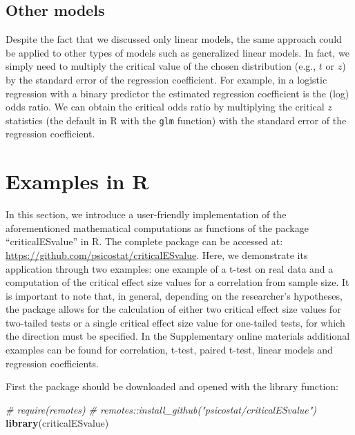 \documentclass[
  man]{apa7}
\newenvironment{Shaded}{\begin{snugshade}}{\end{snugshade}}
\newcommand{\CommentTok}[1]{\textcolor[rgb]{0.56,0.35,0.01}{\textit{#1}}}
\newcommand{\FunctionTok}[1]{\textcolor[rgb]{0.13,0.29,0.53}{\textbf{#1}}}
\newcommand{\NormalTok}[1]{#1}
\begin{document}
\hypertarget{other-models}{%
\subsection{Other models}\label{other-models}}

Despite the fact that we discussed only linear models, the same approach could be applied to other types of models such as generalized linear models. In fact, we simply need to multiply the critical value of the chosen distribution (e.g., \(t\) or \(z\)) by the standard error of the regression coefficient. For example, in a logistic regression with a binary predictor the estimated regression coefficient is the (log) odds ratio. We can obtain the critical odds ratio by multiplying the critical \(z\) statistics (the default in R with the \texttt{glm} function) with the standard error of the regression coefficient.

\hypertarget{examples-in-r}{%
\section{Examples in R}\label{examples-in-r}}

In this section, we introduce a user-friendly implementation of the aforementioned mathematical computations as functions of the package ``criticalESvalue'' in R. The complete package can be accessed at: \url{https://github.com/psicostat/criticalESvalue}. Here, we demonstrate its application through two examples: one example of a t-test on real data and a computation of the critical effect size values for a correlation from sample size. It is important to note that, in general, depending on the researcher's hypotheses, the package allows for the calculation of either two critical effect size values for two-tailed tests or a single critical effect size value for one-tailed tests, for which the direction must be specified. In the Supplementary online materials additional examples can be found for correlation, t-test, paired t-test, linear models and regression coefficients.

First the package should be downloaded and opened with the library function:

\footnotesize

\begin{Shaded}
\begin{Highlighting}[]
\CommentTok{\# require(remotes)}
\CommentTok{\# remotes::install\_github("psicostat/criticalESvalue")}
\FunctionTok{library}\NormalTok{(criticalESvalue)}
\end{Highlighting}
\end{Shaded}
\end{document}
